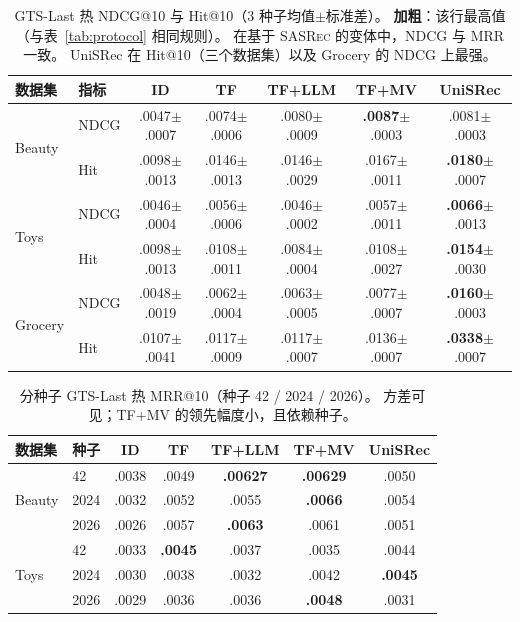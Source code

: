 \documentclass[sigconf,natbib=true,anonymous]{acmart}
\newcommand{\tfmv}{\textsc{TF+MV}\xspace}
\newcommand{\base}{\textsc{SASRec}\xspace}
\begin{document}
\begin{table}[t]
\centering
\caption{%
GTS-Last 热 NDCG@10 与 Hit@10（3 种子均值$\pm$标准差）。
\textbf{加粗}：该行最高值（与表~\ref{tab:protocol} 相同规则）。
在基于 \base 的变体中，NDCG 与 MRR 一致。
UniSRec 在 Hit@10（三个数据集）以及 Grocery 的 NDCG 上最强。%
}
\label{tab:ndcg_hit}
\small
\setlength{\tabcolsep}{2.5pt}
\begin{tabular}{@{}llccccc@{}}
\toprule
数据集 & 指标 & ID & TF & TF+LLM & TF+MV & UniSRec \\
\midrule
\multirow{2}{*}{Beauty}
 & NDCG & .0047\tiny{$\pm$.0007} & .0074\tiny{$\pm$.0006} & .0080\tiny{$\pm$.0009} & \textbf{.0087}\tiny{$\pm$.0003} & .0081\tiny{$\pm$.0003} \\
 & Hit  & .0098\tiny{$\pm$.0013} & .0146\tiny{$\pm$.0013} & .0146\tiny{$\pm$.0029} & .0167\tiny{$\pm$.0011} & \textbf{.0180}\tiny{$\pm$.0007} \\
\midrule
\multirow{2}{*}{Toys}
 & NDCG & .0046\tiny{$\pm$.0004} & .0056\tiny{$\pm$.0006} & .0046\tiny{$\pm$.0002} & .0057\tiny{$\pm$.0011} & \textbf{.0066}\tiny{$\pm$.0013} \\
 & Hit  & .0098\tiny{$\pm$.0013} & .0108\tiny{$\pm$.0011} & .0084\tiny{$\pm$.0004} & .0108\tiny{$\pm$.0027} & \textbf{.0154}\tiny{$\pm$.0030} \\
\midrule
\multirow{2}{*}{Grocery}
 & NDCG & .0048\tiny{$\pm$.0019} & .0062\tiny{$\pm$.0004} & .0063\tiny{$\pm$.0005} & .0077\tiny{$\pm$.0007} & \textbf{.0160}\tiny{$\pm$.0003} \\
 & Hit  & .0107\tiny{$\pm$.0041} & .0117\tiny{$\pm$.0009} & .0117\tiny{$\pm$.0007} & .0136\tiny{$\pm$.0007} & \textbf{.0338}\tiny{$\pm$.0007} \\
\bottomrule
\end{tabular}
\end{table}

\begin{table}[t]
\centering
\caption{%
分种子 GTS-Last 热 MRR@10（种子 42 / 2024 / 2026）。
方差可见；\tfmv 的领先幅度小，且依赖种子。%
}
\label{tab:perseed}
\small
\setlength{\tabcolsep}{3pt}
\begin{tabular}{@{}llccccc@{}}
\toprule
数据集 & 种子 & ID & TF & TF+LLM & TF+MV & UniSRec \\
\midrule
\multirow{3}{*}{Beauty}
 & 42    & .0038 & .0049 & \textbf{.00627} & \textbf{.00629} & .0050 \\
 & 2024  & .0032 & .0052 & .0055 & \textbf{.0066} & .0054 \\
 & 2026  & .0026 & .0057 & \textbf{.0063} & .0061 & .0051 \\
\midrule
\multirow{3}{*}{Toys}
 & 42    & .0033 & \textbf{.0045} & .0037 & .0035 & .0044 \\
 & 2024  & .0030 & .0038 & .0032 & .0042 & \textbf{.0045} \\
 & 2026  & .0029 & .0036 & .0036 & \textbf{.0048} & .0031 \\
\bottomrule
\end{tabular}
\end{table}
\end{document}
